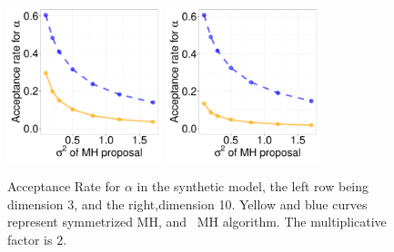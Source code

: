 {\begin{figure}[H]
  \begin{minipage}[!hp]{0.99\linewidth}
    \includegraphics [width=0.40\textwidth, angle=0]{figs/acc/Q_D3alpha_k2.pdf}
	\hspace{.5in}
    \includegraphics [width=0.40\textwidth, angle=0]{figs/acc/Q_D10alpha_k2.pdf}
  \end{minipage}
    \caption{Acceptance Rate for $\alpha$ in the synthetic model, the left row being dimension 3, and the right,dimension 10.  Yellow and blue curves represent symmetrized MH,
 and \naive\ MH  algorithm. The multiplicative factor is $2$. }
     \label{fig:ACC_Q}
  \end{figure}

}

